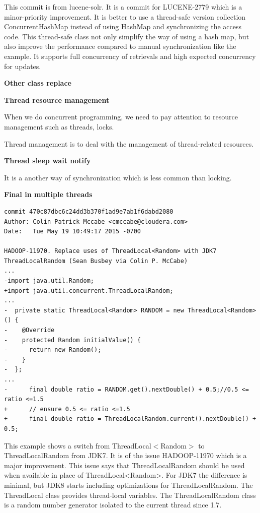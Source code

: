 \documentclass[conference]{IEEEtran}
\begin{document}
This commit is from lucene-solr. It is a commit for LUCENE-2779 which is a minor-priority improvement. It is better to use a thread-safe version collection ConcurrentHashMap instead of using HashMap and synchronizing the access code. This thread-safe class not only simplify the way of using a hash map, but also improve the performance compared to manual synchronization like the example. It supports full concurrency of retrievals and high expected concurrency for updates.

\textbf{Other class replace}

\textbf{Thread resource management}

When we do concurrent programming, we need to pay attention to resource management such as threads, locks.

Thread management is to deal with the management of thread-related resources.

\textbf{Thread sleep wait notify}

It is a another way of synchronization which is less common than locking.

\textbf{Final in multiple threads}

\begin{lstlisting}
commit 470c87dbc6c24dd3b370f1ad9e7ab1f6dabd2080
Author: Colin Patrick Mccabe <cmccabe@cloudera.com>
Date:   Tue May 19 10:49:17 2015 -0700

HADOOP-11970. Replace uses of ThreadLocal<Random> with JDK7 ThreadLocalRandom (Sean Busbey via Colin P. McCabe)
...
-import java.util.Random;
+import java.util.concurrent.ThreadLocalRandom;
...
-  private static ThreadLocal<Random> RANDOM = new ThreadLocal<Random>() {
-    @Override
-    protected Random initialValue() {
-      return new Random();
-    }
-  };
...
-      final double ratio = RANDOM.get().nextDouble() + 0.5;//0.5 <= ratio <=1.5
+      // ensure 0.5 <= ratio <=1.5
+      final double ratio = ThreadLocalRandom.current().nextDouble() + 0.5;
\end{lstlisting}

This example shows a switch from ThreadLocal$<$Random$>$ to ThreadLocalRandom from JDK7. It is of the issue HADOOP-11970 which is a major improvement. This issue says that ThreadLocalRandom should be used when available in place of ThreadLocal<Random>. For JDK7 the difference is minimal, but JDK8 starts including optimizations for ThreadLocalRandom. The ThreadLocal class provides thread-local variables. The ThreadLocalRandom class is a random number generator isolated to the current thread since 1.7.
\end{document}
